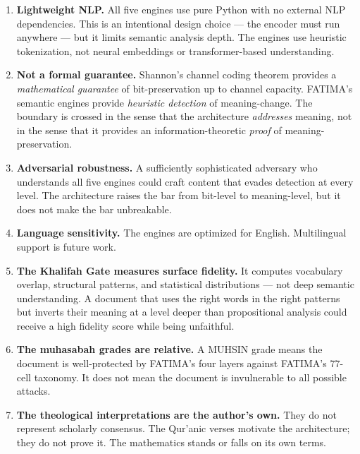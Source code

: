 \documentclass[11pt,a4paper]{article}
\begin{document}
\begin{enumerate}[nosep]
    \item \textbf{Lightweight NLP.} All five engines use pure Python with no external NLP dependencies. This is an intentional design choice --- the encoder must run anywhere --- but it limits semantic analysis depth. The engines use heuristic tokenization, not neural embeddings or transformer-based understanding.

    \item \textbf{Not a formal guarantee.} Shannon's channel coding theorem provides a \textit{mathematical guarantee} of bit-preservation up to channel capacity. FATIMA's semantic engines provide \textit{heuristic detection} of meaning-change. The boundary is crossed in the sense that the architecture \textit{addresses} meaning, not in the sense that it provides an information-theoretic \textit{proof} of meaning-preservation.

    \item \textbf{Adversarial robustness.} A sufficiently sophisticated adversary who understands all five engines could craft content that evades detection at every level. The architecture raises the bar from bit-level to meaning-level, but it does not make the bar unbreakable.

    \item \textbf{Language sensitivity.} The engines are optimized for English. Multilingual support is future work.

    \item \textbf{The Khalifah Gate measures surface fidelity.} It computes vocabulary overlap, structural patterns, and statistical distributions --- not deep semantic understanding. A document that uses the right words in the right patterns but inverts their meaning at a level deeper than propositional analysis could receive a high fidelity score while being unfaithful.

    \item \textbf{The muhasabah grades are relative.} A MUHSIN grade means the document is well-protected by FATIMA's four layers against FATIMA's 77-cell taxonomy. It does not mean the document is invulnerable to all possible attacks.

    \item \textbf{The theological interpretations are the author's own.} They do not represent scholarly consensus. The Qur'anic verses motivate the architecture; they do not prove it. The mathematics stands or falls on its own terms.
\end{enumerate}
\end{document}
